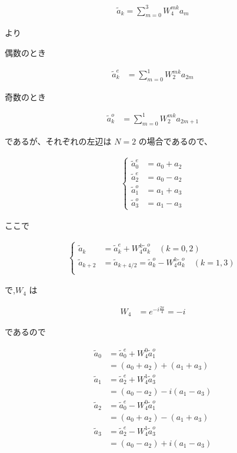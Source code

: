 \begin{align}
    \tilde{a}_k = \sum_{m = 0}^3 W_4^{mk} a_m
\end{align}

より

偶数のとき

\begin{align*}
    \tilde{a}_k^{e} &= \sum_{m = 0}^1 W_2^{mk} a_{2m}
\end{align*}

奇数のとき

\begin{align*}
    \tilde{a}_{k}^{o} &= \sum_{m = 0}^1 W_2^{mk} a_{2m + 1}
\end{align*}

であるが、それぞれの左辺は $N = 2$ の場合であるので、

\begin{align}
    \begin{cases}
        \tilde{a}_0^{e} &= a_0 + a_2 \\ 
        \tilde{a}_2^{e} &= a_0 - a_2 \\
        \tilde{a}_1^{o} &= a_1 + a_3 \\
        \tilde{a}_3^{o} &= a_1 - a_3
    \end{cases}
\end{align}

ここで

\begin{align}
    \begin{cases}
        \tilde{a}_k &= \tilde{a}_k^{e} + W_4^k \tilde{a}_k^{o} \quad(k = 0,2) \\
        \tilde{a}_{k + 2} &= \tilde{a}_{k + 4/2} = \tilde{a}_k^{o} - W_4^k \tilde{a}_k^{o} \quad (k = 1,3) \\
    \end{cases}
\end{align}

で,$W_4$ は

\begin{align*}
    W_4 &= e^{-i\frac{2\pi}{4}} = -i
\end{align*}

であるので

\begin{align*}
    \tilde{a}_0 &= \tilde{a}_0^e + W_4^0 \tilde{a}_1^o \\
                &= (a_0 + a_2) + (a_1 + a_3) \\
    \tilde{a}_1 &= \tilde{a}_2^e + W_4^1 \tilde{a}_3^o \\
                &= (a_0 - a_2) - i (a_1 - a_3) \\
    \tilde{a}_2 &= \tilde{a}_0^e - W_4^0 \tilde{a}_1^o \\
                &= (a_0 + a_2) - (a_1 + a_3) \\
    \tilde{a}_3 &= \tilde{a}_2^e - W_4^1 \tilde{a}_3^o \\
                &= (a_0 - a_2) + i(a_1 - a_3)
\end{align*}

